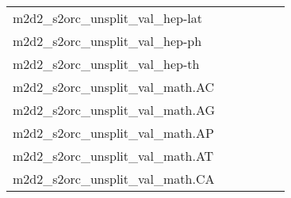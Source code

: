{\begin{longtable}{m{6cm}m{1.7cm}m{1.7cm}m{1.7cm}m{1.7cm}m{1.7cm}}
	m2d2\_s2orc\_unsplit\_val\_hep-lat  & \colorbox[HTML]{eaf7af}{\makebox[\mywidth][c]{13.13}} & \colorbox[HTML]{e5f4ab}{\makebox[\mywidth][c]{13.10}} & \colorbox[HTML]{ffffe5}{\makebox[\mywidth][c]{14.57}} & \colorbox[HTML]{d5eea1}{\makebox[\mywidth][c]{13.02}} & \colorbox[HTML]{77c578}{\makebox[\mywidth][c]{12.80}}\\
	m2d2\_s2orc\_unsplit\_val\_hep-ph  & \colorbox[HTML]{d1ec9f}{\makebox[\mywidth][c]{11.67}} & \colorbox[HTML]{e9f6af}{\makebox[\mywidth][c]{11.81}} & \colorbox[HTML]{ffffe5}{\makebox[\mywidth][c]{13.38}} & \colorbox[HTML]{ceeb9e}{\makebox[\mywidth][c]{11.66}} & \colorbox[HTML]{77c578}{\makebox[\mywidth][c]{11.45}}\\
	m2d2\_s2orc\_unsplit\_val\_hep-th  & \colorbox[HTML]{e1f3a9}{\makebox[\mywidth][c]{11.46}} & \colorbox[HTML]{e6f5ad}{\makebox[\mywidth][c]{11.49}} & \colorbox[HTML]{ffffe5}{\makebox[\mywidth][c]{12.71}} & \colorbox[HTML]{cdeb9d}{\makebox[\mywidth][c]{11.40}} & \colorbox[HTML]{77c578}{\makebox[\mywidth][c]{11.24}}\\
	m2d2\_s2orc\_unsplit\_val\_math.AC  & \colorbox[HTML]{77c578}{\makebox[\mywidth][c]{7.08}} & \colorbox[HTML]{e9f6af}{\makebox[\mywidth][c]{7.37}} & \colorbox[HTML]{ffffe5}{\makebox[\mywidth][c]{8.71}} & \colorbox[HTML]{d1ec9f}{\makebox[\mywidth][c]{7.26}} & \colorbox[HTML]{98d485}{\makebox[\mywidth][c]{7.13}}\\
	m2d2\_s2orc\_unsplit\_val\_math.AG  & \colorbox[HTML]{77c578}{\makebox[\mywidth][c]{8.89}} & \colorbox[HTML]{e7f5ad}{\makebox[\mywidth][c]{9.27}} & \colorbox[HTML]{ffffe5}{\makebox[\mywidth][c]{11.05}} & \colorbox[HTML]{d7efa2}{\makebox[\mywidth][c]{9.16}} & \colorbox[HTML]{93d183}{\makebox[\mywidth][c]{8.95}}\\
	m2d2\_s2orc\_unsplit\_val\_math.AP  & \colorbox[HTML]{77c578}{\makebox[\mywidth][c]{9.35}} & \colorbox[HTML]{d4eea0}{\makebox[\mywidth][c]{9.53}} & \colorbox[HTML]{ffffe5}{\makebox[\mywidth][c]{10.90}} & \colorbox[HTML]{a0d789}{\makebox[\mywidth][c]{9.41}} & \colorbox[HTML]{7ac779}{\makebox[\mywidth][c]{9.35}}\\
	m2d2\_s2orc\_unsplit\_val\_math.AT  & \colorbox[HTML]{91d183}{\makebox[\mywidth][c]{8.57}} & \colorbox[HTML]{def2a6}{\makebox[\mywidth][c]{8.77}} & \colorbox[HTML]{ffffe5}{\makebox[\mywidth][c]{10.16}} & \colorbox[HTML]{d3eda0}{\makebox[\mywidth][c]{8.72}} & \colorbox[HTML]{77c578}{\makebox[\mywidth][c]{8.53}}\\
	m2d2\_s2orc\_unsplit\_val\_math.CA  & \colorbox[HTML]{77c578}{\makebox[\mywidth][c]{9.18}} & \colorbox[HTML]{e5f4ab}{\makebox[\mywidth][c]{9.49}} & \colorbox[HTML]{ffffe5}{\makebox[\mywidth][c]{11.01}} & \colorbox[HTML]{c8e89a}{\makebox[\mywidth][c]{9.36}} & \colorbox[HTML]{b2df90}{\makebox[\mywidth][c]{9.30}}\\

\end{longtable}}
